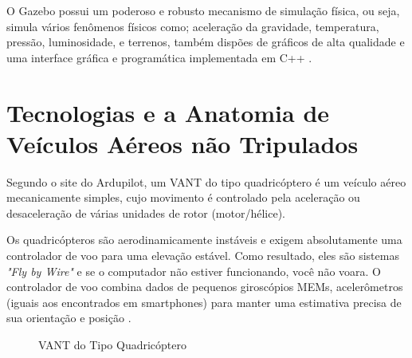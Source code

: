 O Gazebo possui um poderoso e robusto mecanismo de simulação física, ou seja, simula vários fenômenos físicos como; aceleração da gravidade, temperatura, pressão, luminosidade, e terrenos, também dispões de gráficos de alta qualidade e uma interface gráfica e programática implementada em C++ \cite{trintaum}. 
\section{Tecnologias e a Anatomia de Veículos Aéreos não Tripulados}
Segundo o site do Ardupilot, um VANT do tipo quadricóptero é um veículo aéreo mecanicamente simples, cujo movimento é controlado pela aceleração ou desaceleração de várias unidades de rotor (motor/hélice).

Os quadricópteros são aerodinamicamente instáveis e exigem absolutamente uma controlador de voo para uma elevação estável. Como resultado, eles são sistemas \textit{"Fly by Wire"} e se o computador não estiver funcionando, você não voara. O controlador de voo combina dados de pequenos giroscópios MEMs, acelerômetros (iguais aos encontrados em smartphones) para manter uma estimativa precisa de sua orientação e posição \cite{quatorze}.

%
\begin{figure}[H]
	\centering
	\caption{VANT do Tipo Quadricóptero}
	\fontsize{9pt}{12pt}\selectfont
	\def\svgwidth{15cm}
	
	\label{fig:quad}
\end{figure}

